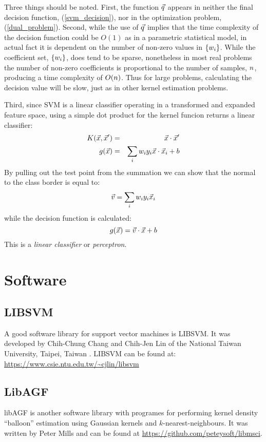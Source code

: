 \documentclass{article}
\newenvironment{eqnnon}{\begin{equation*}}{\end{equation*}}
\newenvironment{eqnarraynon}{\begin{eqnarray*}}{\end{eqnarray*}}
\begin{document}
Three things should be noted. First, the function $\vec q$ appears in
neither the final decision function, (\ref{svm_decision}), nor in the
optimization problem, (\ref{dual_problem}). Second, while the use of
$\vec q$ implies that the time complexity of the decision function 
could be $O(1)$ as in a parametric statistical model, in actual fact it is
dependent on the number of non-zero values in $\lbrace w_i \rbrace$.
While the coefficient set, $\lbrace w_i \rbrace$, does tend to be sparse,
nonetheless in most real problems the number of non-zero coefficients is
proportional to the number of samples, $n$, producing a time complexity
of $O(n)$. Thus for large problems, calculating the decision value will
be slow, just as in other kernel estimation problems.

Third, since SVM is a linear classifier operating in a transformed and expanded
feature space, using a simple dot product for the kernel funcion returns a linear classifier:
\begin{eqnarraynon}
	\vectorkernel(\point, \point^\prime) & = & \point \cdot \point^\prime \\
	\decision(\testpoint) & = & \sum_i \svmcoeff_i \classlabel_i \testpoint \cdot \sample_i + \svmborderconst
\end{eqnarraynon}
By pulling out the test point from the summation we can show that the normal
to the class border is equal to:
\begin{eqnnon}
	\svmbordernormal = \sum_i \svmcoeff_i \classlabel_i \sample_i
\end{eqnnon}
while the decision function is calculated:
\begin{eqnnon}
	\decision(\testpoint)=\svmbordernormal \cdot \testpoint + \svmborderconst
\end{eqnnon}
This is a {\it linear classifier} or {\it perceptron}.
	
\section{Software}

\label{methods}

\subsection{LIBSVM}

A good software library for support vector machines is LIBSVM. 
It was developed by Chih-Chung Chang and Chih-Jen Lin of 
the National Taiwan University, Taipei, Taiwan \citep{Chang_Lin2011}.
LIBSVM can be found at: \url{https://www.csie.ntu.edu.tw/~cjlin/libsvm}

\subsection{LibAGF}

libAGF is another software library with programes for performing kernel
density ``balloon'' estimation using Gaussian kernels and $k$-nearest-neighbours\citep{Mills2011}.
It was written by Peter Mills and can be found at
\url{https://github.com/peteysoft/libmsci}.


\end{document}
